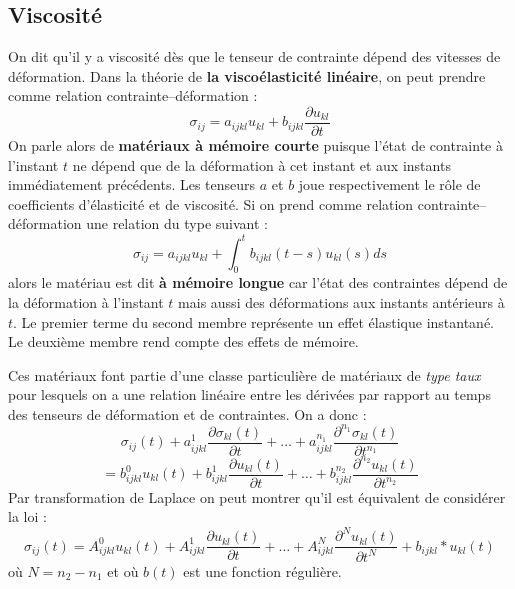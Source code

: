 \documentclass[12pt]{book}
\begin{document}
\subsection{Viscosit\'e}
On dit qu'il y a viscosit\'e d\`es que le tenseur
de contrainte d\'epend des vitesses de d\'eformation.
Dans la th\'eorie de {\bf la visco\'elasticit\'e
lin\'eaire}\cite{ma:equad:Dautray1,ma:equad:Duvaut72}, on peut prendre comme
relation contrainte--d\'eformation :
\begin{equation}
\sigma_{ij}=a_{ijkl}u_{kl}+b_{ijkl}\frac{\partial u_{kl}}{\partial t}
\end{equation}
On parle alors de {\bf mat\'eriaux \`a m\'emoire courte}
puisque 
l'\'etat de contrainte \`a l'instant $t$ ne d\'epend que de la
d\'eformation \`a cet instant et aux instants imm\'ediatement
pr\'ec\'edents. Les tenseurs $a$ et $b$ joue respectivement le r\^ole de
coefficients d'\'elasticit\'e et de viscosit\'e. 
Si on prend comme
relation contrainte--d\'eformation une relation du type suivant :
\begin{equation}\label{eqmatmem}
\sigma_{ij}=a_{ijkl}u_{kl}+\int_0^tb_{ijkl}(t-s)u_{kl}(s)ds
\end{equation}
alors le mat\'eriau est dit {\bf \`a m\'emoire longue} car l'\'etat des
contraintes d\'epend de la d\'eformation \`a l'instant $t$ mais aussi
des d\'eformations aux instants ant\'erieurs \`a $t$.
Le premier terme du second membre repr\'esente un effet \'elastique
instantan\'e. Le deuxi\`eme membre rend compte des effets de m\'emoire.
\begin{rem}
Ces mat\'eriaux\cite{ma:equad:Duvaut72} font partie d'une classe particuli\`ere de
mat\'eriaux de {\it type taux }pour lesquels on a une relation
lin\'eaire entre les d\'eriv\'ees par rapport au temps des tenseurs de
d\'eformation et de contraintes. On a donc :
\begin{equation}
\sigma_{ij}(t)+a^1_{ijkl}\frac{\partial \sigma_{kl}(t)}{\partial
t}+\dots+a^{n_1}_{ijkl}\frac{\partial^{n_1} \sigma_{kl}(t)}{\partial
t^{n_1}} 
\end{equation}
\begin{equation}
=b^0_{ijkl}u_{kl}(t)+b^1_{ijkl}\frac{\partial u_{kl}(t)}{\partial
t}+\dots+b^{n_2}_{ijkl}\frac{\partial^{n_2} u_{kl}(t)}{\partial
t^{n_2}} 
\end{equation}
Par transformation de Laplace on peut montrer qu'il est \'equivalent de
consid\'erer la loi :
\begin{equation}
\sigma_{ij}(t)=A^0_{ijkl}u_{kl}(t)+A^1_{ijkl}\frac{\partial
u_{kl}(t)}{\partial t}+\dots+A^{N}_{ijkl}\frac{\partial^{N}
u_{kl}(t)}{\partial t^{N}}+b_{ijkl}*u_{kl}(t) 
\end{equation}
o\`u $N=n_2-n_1$ et o\`u $b(t)$ est une fonction r\'eguli\`ere.
\end{rem}
\end{document}
